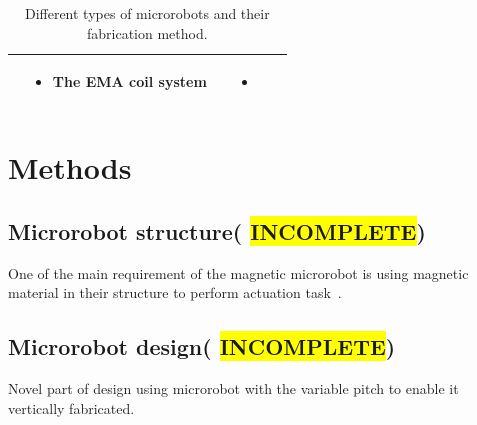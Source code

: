 \documentclass[12pt,a4paper,titlepage]{report}
\newcommand{\hilight}[1]{\colorbox{yellow}{#1}}
\begin{document}
\begin{table}[h!]
\begin{tabular}{ c m{2.5cm}  m{4.3cm} m{3cm} m{2cm}}
\begin{minipage}[t]{3cm}
\begin{itemize}
      \end{itemize}
    \end{minipage}
    & 
    \begin{minipage}[t]{4cm}
      \begin{itemize}
        \item The EMA coil system
     
      \end{itemize}
    \end{minipage}
&



	&
	   \begin{itemize}
        \item \citep{ko2012jellyfish}
   
      \end{itemize}
    \\ \hline








  \end{tabular}
  
  \caption{Different types of microrobots and their fabrication method.}\label{Micro}
\end{table}



\chapter{Methods}

\section{Microrobot structure( \hilight{INCOMPLETE})}

One of the main requirement of the magnetic microrobot is using magnetic material in their structure 
to perform actuation task~\citep{qiu2014noncytotoxic}. 







\section{Microrobot design( \hilight{INCOMPLETE})} \label{microDesign}

Novel part of design using microrobot with the variable pitch to enable it vertically fabricated.
\end{document}
